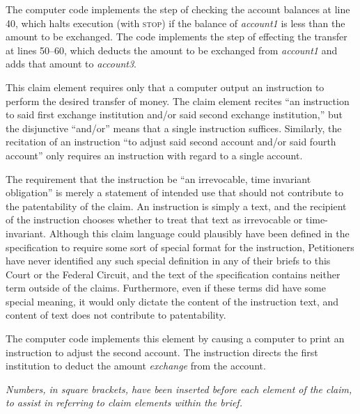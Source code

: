 \documentclass{scotus}
\begin{document}
The computer code implements the step of checking the account balances at line
40, which halts execution (with \textsc{stop}) if the balance of
\emph{account1} is less than the amount to be exchanged. The code implements the
step of effecting the transfer at lines 50--60, which deducts the amount to be
exchanged from \emph{account1} and adds that amount to \emph{account3}.


This claim element requires only that a computer output an instruction to
perform the desired transfer of money. The claim element recites ``an
instruction to said first exchange institution and/or said second exchange
institution,'' but the disjunctive ``and/or'' means that a single instruction
suffices. Similarly, the recitation of an instruction ``to adjust said second
account and/or said fourth account'' only requires an instruction with regard to
a single account.

The requirement that the instruction be ``an irrevocable, time invariant
obligation'' is merely a statement of intended use that should not contribute to
the patentability of the claim. An instruction is simply a text, and the
recipient of the instruction chooses whether to treat that text as irrevocable
or time-invariant. Although this claim language could plausibly have been
defined in the specification to require some sort of special format for the
instruction, Petitioners have never identified any such special definition in
any of their briefs to this Court or the Federal Circuit, and the text of the
specification contains neither term outside of the claims. Furthermore, even if
these terms did have some special meaning, it would only dictate the content of
the instruction text, and content of text does not contribute to patentability.

The computer code implements this element by causing a computer to print an
instruction to adjust the second account. The instruction directs the
first institution to deduct the amount \emph{exchange} from the account.


\emph{Numbers, in square brackets, have been inserted before each element of the
claim, to assist in referring to claim elements within the brief.}

\wholeclaim
\end{document}
